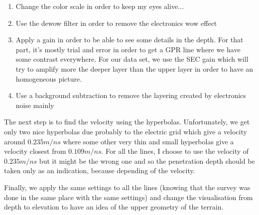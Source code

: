 \begin{enumerate}
    \item Change the color scale in order to keep my eyes alive...
    \item Use the dewow filter in order to remove the electronics wow effect
    \item Apply a gain in order to be able to see some details in the depth. For that part, it's mostly trial and error in order to get a GPR line where we have some contrast everywhere. For our data set, we use the SEC gain which will try to amplify more the deeper layer than the upper layer in order to have an homogeneous picture.
    \item Use a background subtraction to remove the layering created by electronics noise mainly
\end{enumerate}

The next step is to find the velocity using the hyperbolas. Unfortunately, we get only two nice hyperbolas due probably to the electric grid which give a velocity around $0.235 m/ns$ where some other very thin and small hyperbolas give a velocity closest from $0.109 m/ns$. For all the lines, I choose to use the velocity of $0.235 m/ns$ but it might be the wrong one and so the penetration depth should be taken only as an indication, because depending of the velocity.

Finally, we apply the same settings to all the lines (knowing that the survey was done in the same place with the same settings) and change the visualisation from depth to elevation to have an idea of the upper geometry of the terrain.
